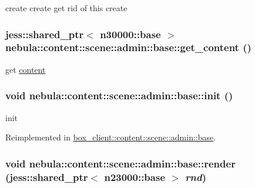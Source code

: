 create create get rid of this create \hypertarget{classnebula_1_1content_1_1scene_1_1admin_1_1base_a72f9c3efe12cd38144f8b4739924c114}{
\subsubsection[{get\_\-content}]{\setlength{\rightskip}{0pt plus 5cm}jess::shared\_\-ptr$<$ {\bf n30000::base} $>$ nebula::content::scene::admin::base::get\_\-content ()}}
\label{classnebula_1_1content_1_1scene_1_1admin_1_1base_a72f9c3efe12cd38144f8b4739924c114}


get \hyperlink{namespacenebula_1_1content}{content} \hypertarget{classnebula_1_1content_1_1scene_1_1admin_1_1base_a7d0a6e0325998166d84d4118634cd15d}{
\subsubsection[{init}]{\setlength{\rightskip}{0pt plus 5cm}void nebula::content::scene::admin::base::init ()}}
\label{classnebula_1_1content_1_1scene_1_1admin_1_1base_a7d0a6e0325998166d84d4118634cd15d}


init 

Reimplemented in \hyperlink{classbox__client_1_1content_1_1scene_1_1admin_1_1base_a9d0a4b10966e7b1be63a3fa83ef6bfec}{box\_\-client::content::scene::admin::base}.\hypertarget{classnebula_1_1content_1_1scene_1_1admin_1_1base_a2277d2ac0673a1b74d93b10271717645}{
\subsubsection[{render}]{\setlength{\rightskip}{0pt plus 5cm}void nebula::content::scene::admin::base::render (jess::shared\_\-ptr$<$ {\bf n23000::base} $>$ {\em rnd})}}
\label{classnebula_1_1content_1_1scene_1_1admin_1_1base_a2277d2ac0673a1b74d93b10271717645}


